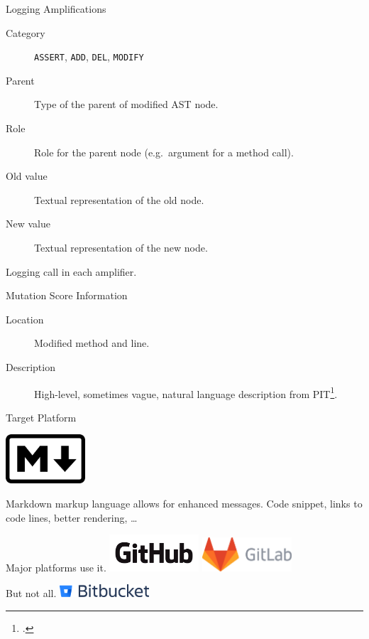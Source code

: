 \documentclass[aspectratio=169,dvipsnames]{beamer}
\begin{document}
\begin{frame}{Logging Amplifications}
  \begin{description}
    \item[Category] \texttt{ASSERT}, \texttt{ADD}, \texttt{DEL}, \texttt{MODIFY}
    \item[Parent] Type of the parent of modified AST node.
    \item[Role] Role for the parent node (e.g.\ argument for a method call).
    \item[Old value] Textual representation of the old node.
    \item[New value] Textual representation of the new node.
  \end{description}

  \pause{}

  Logging call in each amplifier.
\end{frame}

\begin{frame}{Mutation Score Information}
  \begin{description}
    \item[Location] Modified method and line.
    \item[Description] High-level, sometimes vague, natural language description from PIT\footcite{coles2016pit}.
  \end{description}
\end{frame}

\begin{frame}{Target Platform}
  \begin{center}
    \includegraphics[width=8em]{markdown-logo}

    Markdown markup language allows for enhanced messages.
    Code snippet, links to code lines, better rendering, \dots
  \end{center}

  Major platforms use it.
  \includegraphics[width=9em]{GitHub_Logo}
  \includegraphics[width=9em]{wm_no_bg}

  \vfill{}

  But not all.
  \includegraphics[width=9em]{Bitbucket-blue}
\end{frame}
\end{document}
